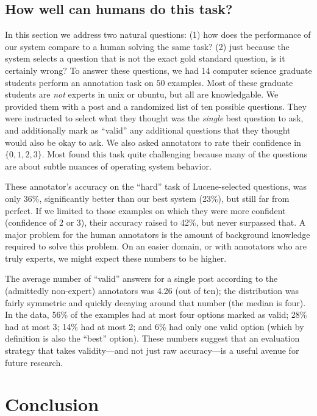 \documentclass[11pt]{report}
\begin{document}
\subsection{How well can humans do this task?}

In this section we address two natural questions:
(1) how does the performance of our system compare to a human solving the same task?
(2) just because the system selects a question that is not the exact gold standard question, is it certainly wrong?
To answer these questions, we had 14 computer science graduate students perform an annotation task on $50$ examples.
Most of these graduate students are \emph{not} experts in unix or ubuntu, but all are knowledgable.
We provided them with a post and a randomized list of ten possible questions.
They were instructed to select what they thought was the \emph{single} best question to ask, and additionally mark as ``valid'' any additional questions that they thought would also be okay to ask.
We also asked annotators to rate their confidence in $\{0,1,2,3\}$.
Most found this task quite challenging because many of the questions are about subtle nuances of operating system behavior.

These annotator's accuracy on the ``hard'' task of Lucene-selected questions, was only 36\%, significantly better than our best system (23\%), but still far from perfect.
If we limited to those examples on which they were more confident (confidence of 2 or 3), their accuracy raised to 42\%, but never surpassed that.
A major problem for the human annotators is the amount of background knowledge required to solve this problem.
On an easier domain, or with annotators who are truly experts, we might expect these numbers to be higher.

The average number of ``valid'' answers for a single post according to the (admittedly non-expert) annotators was 4.26 (out of ten); the distribution was fairly symmetric and quickly decaying around that number (the median is four).
In the data, 56\% of the examples had at most four options marked as valid; 
28\% had at most 3; 14\% had at most 2; and 6\% had only one valid option (which by definition is also the ``best'' option).
These numbers suggest that an evaluation strategy that takes validity---and not just raw accuracy---is a useful avenue for future research.

\section{Conclusion}
\end{document}
